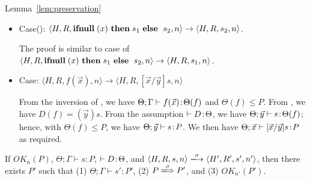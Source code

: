 \begin{pfof}{Lemma~\ref{lem:preservation}}
\begin{itemize}
  We need to find $P'$ such that \(\Theta; \Gamma \vdash s_1\COL P'\)
  , \(P \xLongrightarrow{\tau} P'\) and \(\OK_n(P'\)).  Take \(P\) as
  \(P'\).  Then, \(\OK_n(P')\) and \(P \xLongrightarrow{\tau} P'\)
  hold. We also have \(\Theta; \Gamma' \vdash s_{1}\COL P\) from
  \(\Theta; \Gamma \vdash s_{1}\COL P_1\), \(P_{1} \le P\) and
  .

\item Case(): \(\langle H, R, \IFNULL \Cirx \ \THEN s_{1} \ \ELSE \ s_{2},
  n \rangle \rightarrow \langle H, R, s_{2}, n \rangle\).

 The proof is similar to case of \(\langle H, R, \mathbf{ifnull}\; (x) \ \mathbf{then}\;
 s_{1} \ \mathbf{else}\; \ s_{2}, n \rangle \rightarrow \langle H, R, s_{1}, n
 \rangle\).

\item Case: $\langle H, R, f(\vec{x}) , n \rangle \rightarrow  \langle H, R, [\vec{x}/\vec{y}]s, n  \rangle $


From the inversion of , we have \(\Theta; \Gamma \vdash
f(\vec{x}) \!:\! \Theta(f)\) and \(\Theta(f) \le P\).  From
, we have \(D(f) = (\vec{y})s\).  From the assumption
\(\vdash D \!:\! \Theta\), we have \(\Theta; \vec{y} \vdash s \!:\!
\Theta(f)\); hence, with \(\Theta(f) \le P\), we have \(\Theta;
\vec{y} \vdash s \!:\! P\).  We then have \(\Theta; \vec{x} \vdash
    [\vec{x}/\vec{y}]s \!:\! P\) as required.


\end{itemize}
\end{pfof}

\begin{corollary}
\label{cor:preservation}
If $OK_{n}(P)$, $\Theta; \Gamma \vdash s : P$, \(\vdash D \!:\!
\Theta\), and $\langle H,R,s,n \rangle \xlongrightarrow{\sigma}
\langle H',R',s', n' \rangle$, then there exists $P'$ such that (1) $
\Theta; \Gamma \vdash s' : P'$, (2) \(P \xLongrightarrow{\sigma} P'\),
and (3) \(OK_{n'}(P')\).
\end{corollary}


